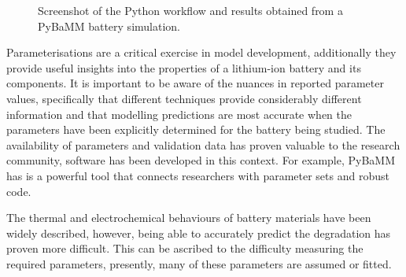 \documentclass[journal=jacsat,manuscript=article]{achemso}
\begin{document}
\begin{figure}[h]
    \centering
    \caption{\label{fig:pybamm} Screenshot of the Python workflow and results obtained from a PyBaMM battery simulation.} 
\end{figure}

Parameterisations are a critical exercise in model development, additionally they provide useful insights into the properties of a lithium-ion battery and its components. It is important to be aware of the nuances in reported parameter values, specifically that different techniques provide considerably different information and that modelling predictions are most accurate when the parameters have been explicitly determined for the battery being studied. The availability of parameters and validation data has proven valuable to the research community, software has been developed in this context. For example, PyBaMM has is a powerful tool that connects researchers with parameter sets and robust code.  

The thermal and electrochemical behaviours of battery materials have been widely described, however, being able to accurately predict the degradation has proven more difficult. 
This can be ascribed to the difficulty measuring the required parameters, presently, many of these parameters are assumed or fitted. 

\end{document}
